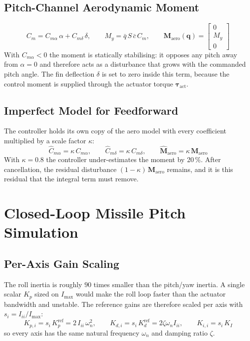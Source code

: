 \documentclass[11pt, a4paper]{article}
\newcommand{\vect}[1]{\boldsymbol{#1}}
\begin{document}
\subsection{Pitch-Channel Aerodynamic Moment}
\begin{equation}
C_m = C_{m\alpha}\, \alpha + C_{m\delta}\, \delta,
\qquad
M_y = \bar{q}\, S\, \bar{c}\, C_m,
\qquad
\vect{M}_{\text{aero}}(\vect{q}) = \begin{bmatrix} 0 \\ M_y \\ 0 \end{bmatrix}
\end{equation}
With $C_{m\alpha} < 0$ the moment is statically stabilising: it opposes any pitch away from $\alpha = 0$ and therefore acts as a disturbance that grows with the commanded pitch angle. The fin deflection $\delta$ is set to zero inside this term, because the control moment is supplied through the actuator torque $\vect{\tau}_{\text{act}}$.

\subsection{Imperfect Model for Feedforward}
The controller holds its own copy of the aero model with every coefficient multiplied by a scale factor $\kappa$:
\begin{equation}
\hat{C}_{m\alpha} = \kappa\, C_{m\alpha},
\qquad
\hat{C}_{m\delta} = \kappa\, C_{m\delta},
\qquad
\hat{\vect{M}}_{\text{aero}} = \kappa\, \vect{M}_{\text{aero}}
\end{equation}
With $\kappa = 0.8$ the controller under-estimates the moment by 20\,\%. After cancellation, the residual disturbance $(1 - \kappa)\, \vect{M}_{\text{aero}}$ remains, and it is this residual that the integral term must remove.

\section{Closed-Loop Missile Pitch Simulation}

\subsection{Per-Axis Gain Scaling}
The roll inertia is roughly $90$ times smaller than the pitch/yaw inertia. A single scalar $K_p$ sized on $I_{\max}$ would make the roll loop faster than the actuator bandwidth and unstable. The reference gains are therefore scaled per axis with $s_i = I_{ii} / I_{\max}$:
\begin{equation}
K_{p,i} = s_i\, K_p^{\text{ref}} = 2\, I_{ii}\, \omega_n^2,
\qquad
K_{d,i} = s_i\, K_d^{\text{ref}} = 2 \zeta \omega_n I_{ii},
\qquad
K_{i,i} = s_i\, K_I
\end{equation}
so every axis has the same natural frequency $\omega_n$ and damping ratio $\zeta$.
\end{document}
